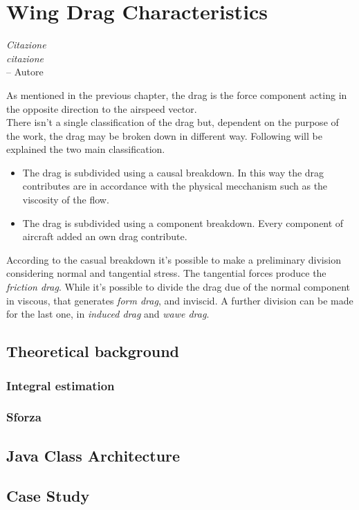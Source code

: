 \chapter{Wing Drag Characteristics}

\label{ch:workobject}

\begin{flushright}
	{\smaller
		\textit{Citazione\\ citazione}\\
		-- Autore}
\end{flushright}


As mentioned in the previous chapter, the drag is the force component acting in the opposite direction to the airspeed vector.\\
There isn't a single classification of the drag but, dependent on the purpose of the work, the drag may be broken down in different way. Following will be explained the two main classification.

\begin{itemize}
\item The drag is subdivided using a causal breakdown. In this way the drag contributes are in accordance with the physical mecchanism such as the viscosity of the flow.
\item The drag is subdivided using a component breakdown. Every component of aircraft added an own drag contribute.
\end{itemize}


According to the casual breakdown it's possible to make a preliminary division considering normal and tangential stress. The tangential forces produce the {\itshape friction drag}. While it's possible to divide the drag due of the normal component in viscous, that generates {\itshape form drag}, and inviscid. A further division can be made for the last one, in {\itshape induced drag}  and {\itshape wawe drag}.\\




\section{Theoretical background}
\subsection{Integral estimation}
\subsection{Sforza}

\section{Java Class Architecture}


\section{Case Study}


